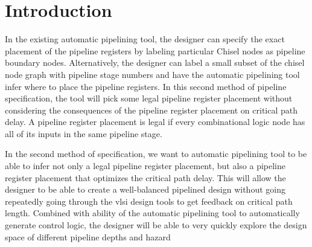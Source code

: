 \section{Introduction}
In the existing automatic pipelining tool, the designer can specify the exact placement of the pipeline registers by labeling particular Chisel nodes as pipeline boundary nodes. Alternatively, the designer can label a small subset of the chisel node graph with pipeline stage numbers and have the automatic pipelining tool infer where to place the pipeline registers. In this second method of pipeline specification, the tool will pick some legal pipeline register placement without considering the consequences of the pipeline register placement on critical path delay. A pipeline register placement is legal if every combinational logic node has all of its inputs in the same pipeline stage.

In the second method of specification, we want to automatic pipelining tool to be able to infer not only a legal pipeline register placement, but also a pipeline register placement that optimizes the critical path delay.  This will allow the designer to be able to create a well-balanced pipelined design without going repeatedly going through the vlsi design tools to get feedback on critical path length.  Combined with ability of the automatic pipelining tool to automatically generate control logic, the designer will be able to very quickly explore the design space of different pipeline depths and hazard 

